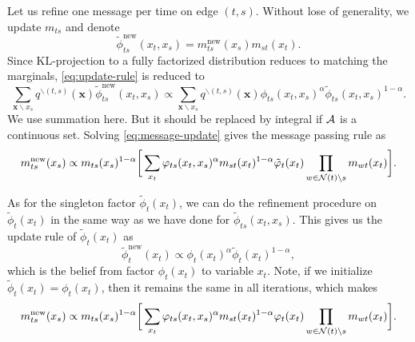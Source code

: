\documentclass[conference,onecolumn]{IEEEtran}
\begin{document}
Let us refine one message per time on edge $(t,s)$. Without lose of generality, we update $m_{ts}$ and denote
\begin{equation}
  \tilde{\phi}_{ts}^{\mathrm{new}}(x_t, x_s) = m_{ts}^{\mathrm{new}}(x_s) m_{st}(x_t).
\end{equation}
Since KL-projection to a fully factorized distribution reduces to matching the marginals, \autoref{eq:update-rule} is reduced to
\begin{equation}\label{eq:message-update}
  \sum_{\bm{x}\backslash x_s} q^{\backslash (t,s)}(\bm{x}) \tilde{\phi}_{ts}^{\mathrm{new}}(x_t, x_s) \propto \sum_{\bm{x}\backslash x_s} q^{\backslash (t,s)}(\bm{x}) \phi_{ts}(x_t, x_s)^{\alpha} \tilde{\phi}_{ts}(x_t, x_s)^{1-\alpha}.
\end{equation}
We use summation here. But it should be replaced by integral if $\mathcal{A}$ is a continuous set.
Solving \autoref{eq:message-update} gives the message passing rule as
\begin{equation}\label{eq:message-rule}
  {m}^{\text{new}}_{ts}(x_s) \propto  m_{ts}(x_s)^{1-\alpha} \bigg[
  \sum_{x_t} \varphi_{ts}(x_t, x_s)^{\alpha} {m}_{st}(x_t)^{1-\alpha}
  \tilde{\varphi}_t(x_t) \prod_{w\in \mathcal{N}(t)\backslash s}m_{wt}(x_t) \bigg].
\end{equation}

As for the singleton factor $\tilde{\phi}_t(x_t)$, we can do the refinement procedure on $\tilde{\phi}_t(x_t)$ in the same way as we have done for $\tilde{\phi}_{ts}(x_t, x_s)$. This gives us the update rule of $\tilde{\phi}_t(x_t)$ as
\begin{equation}\label{eq:fix-factor-update}
  \tilde{\phi}_t^{\text{new}}(x_t) \propto \phi_t(x_t)^{\alpha} \tilde{\phi}_t(x_t)^{1-\alpha},
\end{equation}
which is the belief from factor $\phi_t(x_t)$ to variable $x_t$. Note, if
we initialize $\tilde{\phi}_t(x_t) = \phi_t(x_t)$, then it remains the
same in all iterations, which makes
\begin{equation}\label{eq:message-rule}
  {m}^{\text{new}}_{ts}(x_s) \propto  m_{ts}(x_s)^{1-\alpha} \bigg[
  \sum_{x_t} \varphi_{ts}(x_t, x_s)^{\alpha} {m}_{st}(x_t)^{1-\alpha} {\varphi}_t(x_t) \prod_{w\in \mathcal{N}(t)\backslash s}m_{wt}(x_t) \bigg].
\end{equation}
\end{document}
